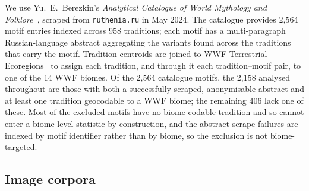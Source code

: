 \documentclass[11pt,a4paper]{article}
\begin{document}
We use Yu.\ E.\ Berezkin's \emph{Analytical Catalogue of World
Mythology and Folklore}~\citep{berezkin2024catalogue}, scraped from
\texttt{ruthenia.ru} in May 2024. The catalogue provides 2{,}564 motif
entries indexed across 958 traditions; each motif has a
multi-paragraph Russian-language abstract aggregating the variants
found across the traditions that carry the motif. Tradition centroids
are joined to WWF Terrestrial
Ecoregions~\citep{olson2001terrestrial} to assign each tradition, and
through it each tradition--motif pair, to one of the 14 WWF biomes. Of
the 2{,}564 catalogue motifs, the 2{,}158 analysed throughout are those
with both a successfully scraped, anonymisable abstract and at least one
tradition geocodable to a WWF biome; the remaining $406$ lack one of
these. Most of the excluded motifs have no biome-codable tradition and
so cannot enter a biome-level statistic by construction, and the
abstract-scrape failures are indexed by motif identifier rather than by
biome, so the exclusion is not biome-targeted.

\subsection*{Image corpora}
\end{document}
